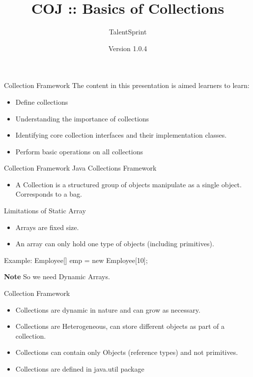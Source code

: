 \documentclass[14pt]{beamer}
\title[CP01.13 BC]{COJ :: Basics of Collections}
\author[TS]{TalentSprint}
\institute[L\&D]{Licensed To Skill}
\date{Version 1.0.4}
\begin{document}
\begin{frame}
  \titlepage
\end{frame}
\begin{frame}{Collection Framework}
The content in this presentation is aimed learners to learn:
 \begin{itemize}
  \item Define collections 
  \item Understanding the importance of collections
  \item Identifying core collection interfaces and their implementation classes. 
  \item Perform basic operations on all collections
 
 \end{itemize}
\end{frame}

\begin{frame}{Collection Framework}
Java Collections Framework
\begin{itemize}
\item A Collection is a structured group of objects manipulate as a single object. Corresponds to a bag.
\end{itemize}
Limitations of Static Array
\begin{itemize}
\item Arrays are fixed size.
\item An array can only hold one type of objects (including primitives).
\end{itemize}
Example: Employee[] emp = new Employee[10];

\textbf{Note}  So we need Dynamic Arrays.
\end{frame}
\begin{frame}{Collection Framework}
\begin{itemize}
\item Collections are dynamic in nature and can grow as necessary.
\item Collections are Heterogeneous, can store different objects as part of a collection.
\item Collections can contain only Objects (reference types) and not primitives.
\item Collections are defined in java.util package
\end{itemize}
\end{frame}
\end{document}
